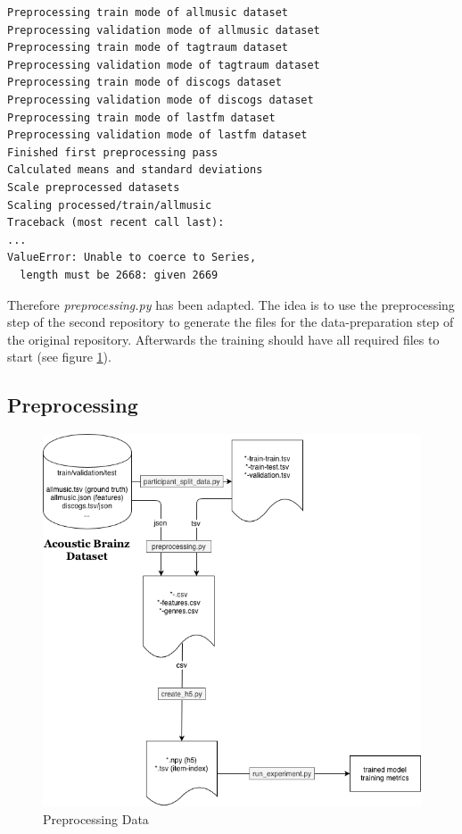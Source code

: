 \documentclass[sigconf,nonacm]{acmart}
\begin{document}
\begin{lstlisting}
Preprocessing train mode of allmusic dataset
Preprocessing validation mode of allmusic dataset
Preprocessing train mode of tagtraum dataset
Preprocessing validation mode of tagtraum dataset
Preprocessing train mode of discogs dataset
Preprocessing validation mode of discogs dataset
Preprocessing train mode of lastfm dataset
Preprocessing validation mode of lastfm dataset
Finished first preprocessing pass
Calculated means and standard deviations
Scale preprocessed datasets
Scaling processed/train/allmusic
Traceback (most recent call last):
...
ValueError: Unable to coerce to Series, 
  length must be 2668: given 2669
\end{lstlisting}

Therefore \textit{preprocessing.py} has been adapted. The idea is to use the preprocessing step of the second repository to generate the files for the data-preparation step of the original repository. Afterwards the training should have all required files to start (see figure \ref{fig:preprocess}).

\subsection{Preprocessing}
  \begin{figure}
    \includegraphics[width=\linewidth]{Preprocess-Data.png}
    \caption{Preprocessing Data}
    \label{fig:preprocess}
  \end{figure}
\end{document}
